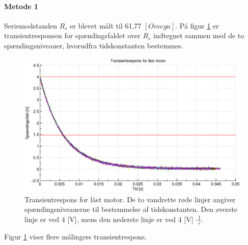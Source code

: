 \paragraph{Metode 1}
Seriemodstanden \(R_s\) er blevet målt til 61,77 \([Omega]\).
På figur \ref{fig:induktans0} er transientresponsen for spændingsfaldet over \(R_s\) indtegnet
sammen med de to spændingsniveauer, hvorudfra tidskonstanten bestemmes.
\begin{figure}[th!]
	\centering
	\includegraphics[width=1\textwidth]{./graphics/induktans0.eps}
	\caption[Transientrespons for låst motor]
		{Transientrespons for låst motor. De to vandrette røde linjer angiver spændingsniveauerne til bestemmelse af tidskonstanten.
		Den øverste linje er ved 4 [V], mens den nederste linje er ved 4 [V] \(\cdot \frac{1}{e}\).}
	\label{fig:induktans0}
\end{figure}
Figur \ref{fig:induktans0} viser flere målingers transientrespons.

